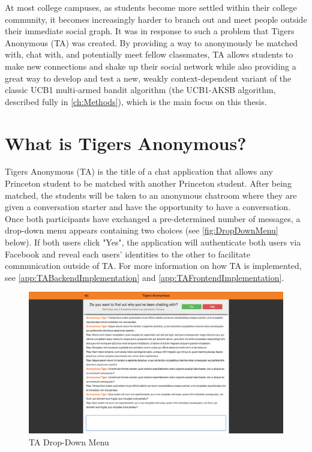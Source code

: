 At most college campuses, as students become more settled within their college community, it becomes increasingly harder to branch out and meet people outside their immediate social graph. It was in response to such a problem that Tigers Anonymous (TA) was created. By providing a way to anonymously be matched with, chat with, and potentially meet fellow classmates, TA allows students to make new connections and shake up their social network while also providing a great way to develop and test a new, weakly context-dependent variant of the classic UCB1 multi-armed bandit algorithm (the UCB1-AKSB algorithm, described fully in \autoref{ch:Methods}), which is the main focus on this thesis.

\section{What is Tigers Anonymous?}

Tigers Anonymous (TA) is the title of a chat application that allows any Princeton student to be matched with another Princeton student. After being matched, the students will be taken to an anonymous chatroom where they are given a conversation starter and have the opportunity to have a conversation. Once both participants have exchanged a pre-determined number of messages, a drop-down menu appears containing two choices (see \autoref{fig:DropDownMenu} below). If both users click "Yes", the application will authenticate both users via Facebook and reveal each users' identities to the other to facilitate communication outside of TA. For more information on how TA is implemented, see \autoref{app:TABackendImplementation} and \autoref{app:TAFrontendImplementation}.

\begin{figure}[h]
\centering
\includegraphics[trim= 120mm 0mm 120mm 0mm, clip, scale=0.36]{./Figures/FullChatDropDown}
\caption{TA Drop-Down Menu}
\label{fig:DropDownMenu}
\end{figure}

